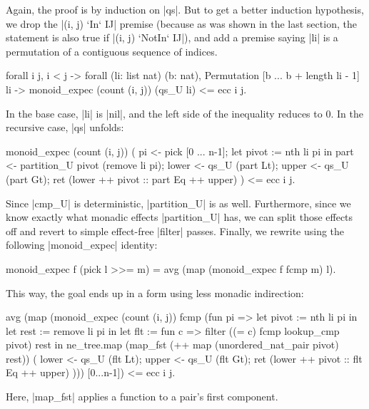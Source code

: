 \documentclass[runningheads]{llncs}
\begin{document}
Again, the proof %
is by induction on |qs|. But to get a better induction hypothesis, we drop the |(i, j) `In` IJ| premise (because as was shown in the last section, the statement is also true if |(i, j) `NotIn` IJ|), and add a premise saying |li| is a permutation of a contiguous sequence of indices.
\begin{code}
  forall i j, i < j -> forall (li: list nat) (b: nat), Permutation [b ... b + length li - 1] li ->
    monoid_expec (count (i, j)) (qs_U li) <= ecc i j.
\end{code}
In the base case, |li| is |nil|, and the left side of the inequality reduces to 0. In the recursive case, |qs| unfolds:
\begin{code}
monoid_expec (count (i, j)) (
    pi <- pick [0 ... n-1];
    let pivot := nth li pi in
    part <- partition_U pivot (remove li pi);
    lower <- qs_U (part Lt);
    upper <- qs_U (part Gt);
    ret (lower ++ pivot :: part Eq ++ upper)
  ) <= ecc i j.
\end{code}
Since |cmp_U| is deterministic, |partition_U| is as well. Furthermore, since
we know exactly what monadic effects |partition_U| has, we can split those
effects off and revert to simple effect-free |filter| passes. Finally, we rewrite using the following |monoid_expec| identity:
\begin{code}
  monoid_expec f (pick l >>= m) = avg (map (monoid_expec f fcmp m) l).
\end{code}
This way, the goal ends up in a form using less monadic indirection:
\begin{code}
avg (map (monoid_expec (count (i, j)) fcmp (fun pi =>
    let pivot := nth li pi in
    let rest := remove li pi in
    let flt := fun c => filter ((= c) fcmp lookup_cmp pivot) rest in
    ne_tree.map (map_fst (++ map (unordered_nat_pair pivot) rest)) (
      lower <- qs_U (flt Lt);
      upper <- qs_U (flt Gt);
      ret (lower ++ pivot :: flt Eq ++ upper)
    ))) [0...n-1]) <= ecc i j.
\end{code}
Here, |map_fst| applies a function to a pair's first component.
\end{document}
